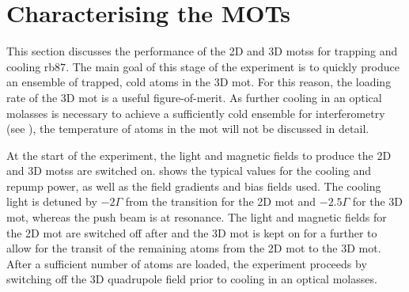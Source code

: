 \section{Characterising the MOTs}\label{sec:mot_characterisation}
This section discusses the performance of the 2D and 3D \acp{mots} for trapping
and cooling \ac{rb87}. The main goal of this stage of the experiment is to
quickly produce an ensemble of trapped, cold atoms in the 3D \ac{mot}. For this
reason, the loading rate of the 3D \ac{mot} is a useful figure-of-merit. As further
cooling in an optical molasses is necessary to achieve a sufficiently cold ensemble for interferometry
(see ), the temperature of atoms in the \ac{mot} will not be discussed in detail. \par\noindent

At the start of the experiment, the light and magnetic fields to produce the 2D and
3D \acp{mots} are switched on.  shows the typical values for the cooling and
repump power, as well as the field gradients and bias fields used. The cooling light is detuned by \(-2 \Gamma\) from the  transition for the 2D \ac{mot} and \(-2.5 \Gamma\) for the 3D \ac{mot}, whereas the push beam is at resonance. The light and magnetic fields for the 2D \ac{mot} are switched off after  and the 3D \ac{mot} is kept on for a further  to allow for the transit of the remaining atoms from the 2D \ac{mot} to the 3D \ac{mot}. After a sufficient number of atoms are loaded, the experiment proceeds by switching off the 3D quadrupole field prior to cooling in an optical molasses.
